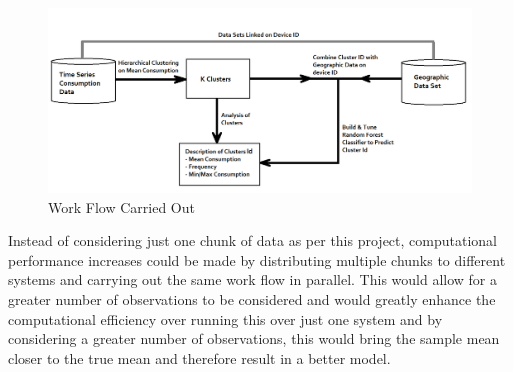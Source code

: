 \begin{figure}[H]
\centering     
\includegraphics[width=1\textwidth]{Figures/workflow.png}
\caption{Work Flow Carried Out}
\label{fig:Dendrogram}
\end{figure} 

Instead of considering just one chunk of data as per this project, computational performance increases could be made by distributing multiple chunks to different systems and carrying out the same work flow in parallel. This would allow for a greater number of observations to be considered and would greatly enhance the computational efficiency over running this over just one system and by considering a greater number of observations, this would bring the sample mean closer to the true mean and therefore result in a better model.
